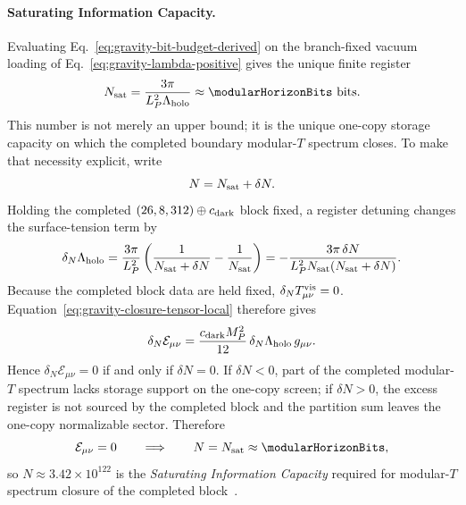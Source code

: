 \documentclass[11pt]{article}
\begin{document}
\paragraph{Saturating Information Capacity.}
Evaluating Eq.~\eqref{eq:gravity-bit-budget-derived} on the branch-fixed
vacuum loading of Eq.~\eqref{eq:gravity-lambda-positive} gives the unique
finite register
\begin{equation}
\label{eq:gravity-saturating-information-capacity}
 N_{\rm sat}
 =
 \frac{3\pi}{L_P^2\Lambda_{\rm holo}}
 \approx
 \modularHorizonBits\ \text{bits}.
\end{equation}
This number is not merely an upper bound; it is the unique one-copy storage
capacity on which the completed boundary modular-$T$ spectrum closes. To make
that necessity explicit, write
\begin{equation}
\label{eq:gravity-capacity-detuning-parameter}
 N=N_{\rm sat}+\delta N.
\end{equation}
Holding the completed $(26,8,312)\oplus c_{\rm dark}$ block fixed, a register
detuning changes the surface-tension term by
\begin{equation}
\label{eq:gravity-capacity-lambda-detuning}
 \delta_N\Lambda_{\rm holo}
 =
 \frac{3\pi}{L_P^2}\left(\frac{1}{N_{\rm sat}+\delta N}-\frac{1}{N_{\rm sat}}\right)
 =
 -\frac{3\pi\,\delta N}{L_P^2N_{\rm sat}(N_{\rm sat}+\delta N)}.
\end{equation}
Because the completed block data are held fixed, $\delta_NT^{\rm vis}_{\mu\nu}=0$.
Equation~\eqref{eq:gravity-closure-tensor-local} therefore gives
\begin{equation}
\label{eq:gravity-capacity-closure-detuning}
 \delta_N\mathcal E_{\mu\nu}
 =
 \frac{c_{\rm dark}M_P^2}{12}\,\delta_N\Lambda_{\rm holo}\,g_{\mu\nu}.
\end{equation}
Hence $\delta_N\mathcal E_{\mu\nu}=0$ if and only if $\delta N=0$. If
$\delta N<0$, part of the completed modular-$T$ spectrum lacks storage support
on the one-copy screen; if $\delta N>0$, the excess register is not sourced by
the completed block and the partition sum leaves the one-copy normalizable
sector. Therefore
\begin{equation}
\label{eq:gravity-capacity-iff-closure}
 \mathcal E_{\mu\nu}=0
 \qquad\Longrightarrow\qquad
 N=N_{\rm sat}\approx\modularHorizonBits,
\end{equation}
so $N\approx3.42\times10^{122}$ is the \emph{Saturating Information Capacity}
required for modular-$T$ spectrum closure of the completed block~\cite{friedan1987,witten1989,gko1985}.
\end{document}

